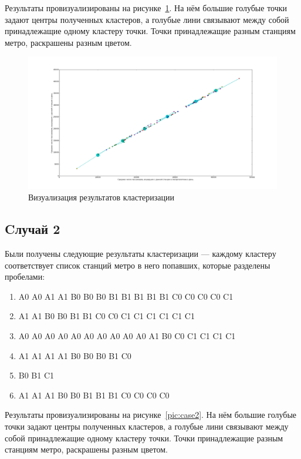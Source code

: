 \documentclass[12pt,a4paper,oneside]{extarticle}
\begin{document}
        Результаты провизуализированы на рисунке~\ref{pic:case1}. На нём большие голубые точки задают центры полученных кластеров, а голубые лини связывают между собой принадлежащие одному кластеру точки. Точки принадлежащие разным станциям метро, раскрашены разным цветом.

        \begin{figure}[ht!]
            \center
            \includegraphics[scale=0.3]{figure_1.png}
            \caption{Визуализация результатов кластеризации}
            \label{pic:case1}
        \end{figure}

    \subsection{Cлучай 2}
        Были получены следующие результаты кластеризации --- каждому кластеру соответствует список станций метро в него попавших, которые разделены пробелами:
        \begin{enumerate}
            \item A0 A0 A1 A1 B0 B0 B0 B1 B1 B1 B1 B1 C0 C0 C0 C0 C1 
            \item A1 A1 B0 B0 B1 B1 C0 C0 C1 C1 C1 C1 C1 C1 
            \item A0 A0 A0 A0 A0 A0 A0 A0 A0 A0 A1 B0 C0 C1 C1 C1 C1 
            \item A1 A1 A1 A1 B0 B0 B0 B1 C0 
            \item B0 B1 C1 
            \item A1 A1 A1 B0 B0 B1 B1 B1 C0 C0 C0 C0
        \end{enumerate}

        Результаты провизуализированы на рисунке~\ref{pic:case2}. На нём большие голубые точки задают центры полученных кластеров, а голубые лини связывают между собой принадлежащие одному кластеру точки. Точки принадлежащие разным станциям метро, раскрашены разным цветом.
\end{document}
